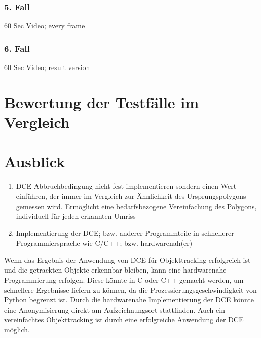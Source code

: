 \subsubsection{5. Fall} {60 Sec Video; every frame}
\subsubsection{6. Fall} {60 Sec Video; result version}


\section{Bewertung der Testfälle im Vergleich}




\section{Ausblick}
\begin{enumerate}
	\item DCE Abbruchbedingung nicht fest implementieren sondern einen Wert einführen, der immer im Vergleich zur Ähnlichkeit des Ursprungspolygons gemessen wird. Ermöglicht eine bedarfsbezogene Vereinfachung des Polygons, individuell für jeden erkannten Umriss
	\item Implementierung der DCE; bzw. anderer Programmteile in schnellerer Programmiersprache wie C/C++; bzw. hardwarenah(er)
\end{enumerate}
{
	Wenn das Ergebnis der Anwendung von DCE für Objekttracking erfolgreich ist und die getrackten Objekte erkennbar bleiben, kann eine hardwarenahe Programmierung erfolgen. Diese könnte in C oder C++ gemacht werden, um schnellere Ergebnisse liefern zu können, da die Prozessierungsgeschwindigkeit von Python begrenzt ist.\newline
Durch die hardwarenahe Implementierung der DCE könnte eine Anonymisierung direkt am Aufzeichnungsort stattfinden. Auch ein vereinfachtes Objekttracking ist durch eine erfolgreiche Anwendung der DCE möglich.


}




